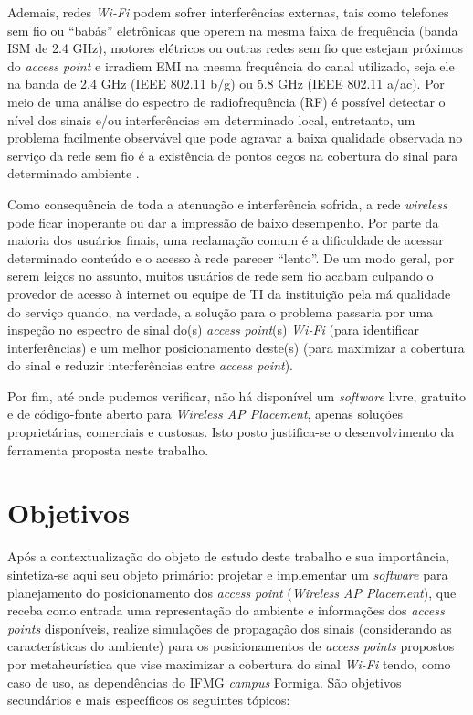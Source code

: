 \documentclass[
	12pt,				%
	twoside,			%
	a4paper,			%
	english,			%
	french,				%
	spanish,			%
	brazil				%
	]{abntex2}
\begin{document}
Ademais, redes \emph{Wi-Fi} podem sofrer interferências externas, tais
como telefones sem fio ou ``babás'' eletrônicas que operem na mesma
faixa de frequência (banda ISM de 2.4 GHz), motores elétricos ou outras
redes sem fio que estejam próximos do \emph{access point} e irradiem EMI
na mesma frequência do canal utilizado, seja ele na banda de 2.4 GHz
(IEEE 802.11 b/g) ou 5.8 GHz (IEEE 802.11 a/ac). Por meio de uma análise
do espectro de radiofrequência (RF) é possível detectar o nível dos
sinais e/ou interferências em determinado local, entretanto, um problema
facilmente observável que pode agravar a baixa qualidade observada no
serviço da rede sem fio é a existência de pontos cegos na cobertura do
sinal para determinado ambiente \cite{RUBINSTEINS}.

Como consequência de toda a atenuação e interferência sofrida, a rede
\emph{wireless} pode ficar inoperante ou dar a impressão de baixo
desempenho. Por parte da maioria dos usuários finais, uma reclamação
comum é a dificuldade de acessar determinado conteúdo e o acesso à rede
parecer ``lento''. De um modo geral, por serem leigos no assunto, muitos
usuários de rede sem fio acabam culpando o provedor de acesso à internet
ou equipe de TI da instituição pela má qualidade do serviço quando, na
verdade, a solução para o problema passaria por uma inspeção no espectro
de sinal do(s) \emph{access point}(s) \emph{Wi-Fi} (para identificar
interferências) e um melhor posicionamento deste(s) (para maximizar a
cobertura do sinal e reduzir interferências entre \emph{access point}).

Por fim, até onde pudemos verificar, não há disponível um
\emph{software} livre, gratuito e de código-fonte aberto para
\emph{Wireless AP Placement}, apenas soluções proprietárias, comerciais
e custosas. Isto posto justifica-se o desenvolvimento da ferramenta
proposta neste trabalho.

\section{Objetivos}\label{objetivos}

Após a contextualização do objeto de estudo deste trabalho e sua
importância, sintetiza-se aqui seu objeto primário: projetar e
implementar um \emph{software} para planejamento do posicionamento dos
\emph{access point} (\emph{Wireless AP Placement}), que receba como
entrada uma representação do ambiente e informações dos \emph{access
points} disponíveis, realize simulações de propagação dos sinais
(considerando as características do ambiente) para os posicionamentos de
\emph{access points} propostos por metaheurística que vise maximizar a
cobertura do sinal \emph{Wi-Fi} tendo, como caso de uso, as dependências
do IFMG \emph{campus} Formiga. São objetivos secundários e mais
específicos os seguintes tópicos:
\end{document}
